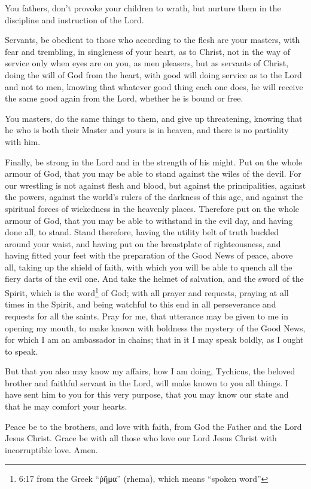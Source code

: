  You fathers, don't provoke your children to wrath, but
nurture them in the discipline and instruction of the Lord.

 Servants, be obedient to those who according to the flesh
are your masters, with fear and trembling, in singleness of your heart,
as to Christ,  not in the way of service only when eyes are
on you, as men pleasers, but as servants of Christ, doing the will of
God from the heart,  with good will doing service as to the
Lord and not to men,  knowing that whatever good thing each
one does, he will receive the same good again from the Lord, whether he
is bound or free.

 You masters, do the same things to them, and give up
threatening, knowing that he who is both their Master and yours is in
heaven, and there is no partiality with him.

 Finally, be strong in the Lord and in the strength of his
might.  Put on the whole armour of God, that you may be
able to stand against the wiles of the devil.  For our
wrestling is not against flesh and blood, but against the
principalities, against the powers, against the world's rulers of the
darkness of this age, and against the spiritual forces of wickedness in
the heavenly places.  Therefore put on the whole armour of
God, that you may be able to withstand in the evil day, and having done
all, to stand.  Stand therefore, having the utility belt of
truth buckled around your waist, and having put on the breastplate of
righteousness,  and having fitted your feet with the
preparation of the Good News of peace,  above all, taking
up the shield of faith, with which you will be able to quench all the
fiery darts of the evil one.  And take the helmet of
salvation, and the sword of the Spirit, which is the word\footnote{6:17
  from the Greek ``ῥῆμα'' (rhema), which means ``spoken word''} of God;
 with all prayer and requests, praying at all times in the
Spirit, and being watchful to this end in all perseverance and requests
for all the saints.  Pray for me, that utterance may be
given to me in opening my mouth, to make known with boldness the mystery
of the Good News,  for which I am an ambassador in chains;
that in it I may speak boldly, as I ought to speak.

 But that you also may know my affairs, how I am doing,
Tychicus, the beloved brother and faithful servant in the Lord, will
make known to you all things.  I have sent him to you for
this very purpose, that you may know our state and that he may comfort
your hearts.

 Peace be to the brothers, and love with faith, from God
the Father and the Lord Jesus Christ.  Grace be with all
those who love our Lord Jesus Christ with incorruptible love. Amen.
